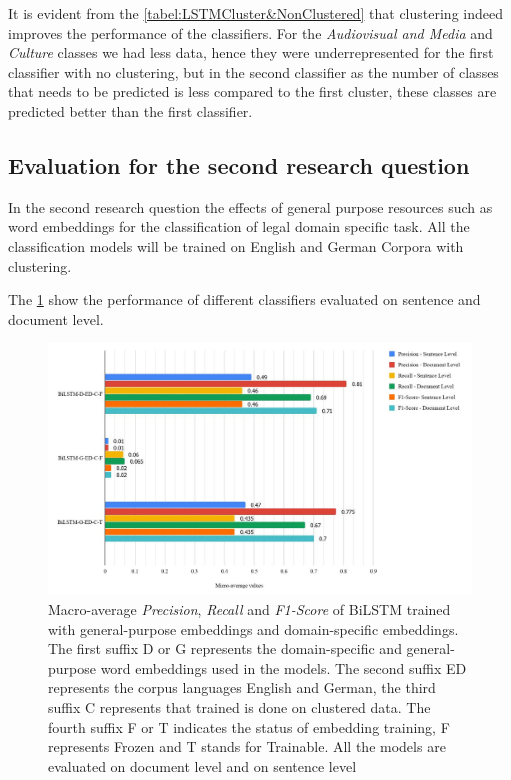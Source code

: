 It is evident from the \ref{tabel:LSTMCluster&NonClustered} that clustering indeed improves the performance of the classifiers. For the \textit{Audiovisual and Media} and \textit{Culture} classes we had less data, hence they were underrepresented for the first classifier with no clustering, but in the second classifier as the number of classes that needs to be predicted is less compared to the first cluster, these classes are predicted better than the first classifier.


\clearpage


\subsection{Evaluation for the second research question}

In the second research question the effects of general purpose resources such as word embeddings for the classification of legal domain specific task. All the classification models will be trained on English and German Corpora with clustering. 

The \ref{fig:SecondEvalQuestion} show the performance of different classifiers evaluated on sentence and document level.

\begin{figure}[!ht]
    \centering
    \includegraphics[width=15cm, keepaspectratio]{pics/2.jpg}
    \caption{Macro-average \textit{Precision}, \textit{Recall} and \textit{F1-Score} of \gls{BiLSTM} trained with general-purpose embeddings and domain-specific embeddings. The first suffix D or G represents the domain-specific and general-purpose word embeddings used in the models. The second suffix ED represents the corpus languages English and German, the third suffix C represents that trained is done on clustered data. The fourth suffix F or T indicates the status of embedding training, F represents Frozen and T stands for Trainable. All the models are evaluated on document level and on sentence level}
    \label{fig:SecondEvalQuestion}
\end{figure}

